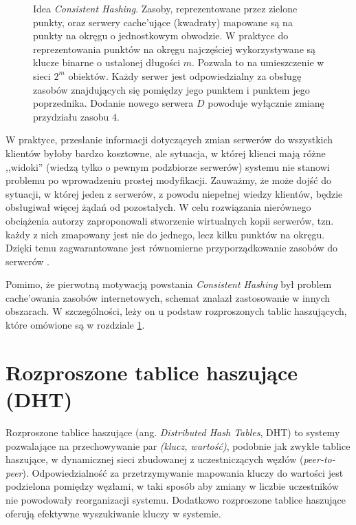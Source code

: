 \documentclass[a4paper,11pt]{scrartcl}
\newcommand{\s}{ }
\newcommand{\keszujace}{cache'ujące}
\newcommand{\keszowania}{cache'owania}
\begin{document}
\begin{figure}[ht]
\begin{minipage}[b]{0.47\linewidth}
\end{minipage}
\caption{Idea \textit{Consistent Hashing}. Zasoby, reprezentowane przez zielone punkty, oraz serwery \keszujace\s (kwadraty) mapowane są na punkty na okręgu o jednostkowym obwodzie. W praktyce do reprezentowania punktów na okręgu najczęściej wykorzystywane są klucze binarne o ustalonej długości $m$. Pozwala to na umieszczenie w sieci $2^m$ obiektów. Każdy serwer jest odpowiedzialny za obsługę zasobów znajdujących się pomiędzy jego punktem i punktem jego poprzednika. Dodanie nowego serwera $D$ powoduje wyłącznie zmianę przydziału zasobu $4$.}
\label{fig_consistent_hashing}
\end{figure}

W praktyce, przesłanie informacji dotyczących zmian serwerów do wszystkich klientów byłoby bardzo kosztowne, ale sytuacja, w której klienci mają różne ,,widoki'' (wiedzą tylko o pewnym podzbiorze serwerów) systemu nie stanowi problemu po wprowadzeniu prostej modyfikacji. Zauważmy, że może dojść do sytuacji, w której jeden z serwerów, z powodu niepełnej wiedzy klientów, będzie obsługiwał więcej żądań od pozostałych. W celu rozwiązania nierównego obciążenia autorzy zaproponowali stworzenie wirtualnych kopii serwerów, tzn. każdy z nich zmapowany jest nie do jednego, lecz kilku punktów na okręgu. Dzięki temu zagwarantowane jest równomierne przyporządkowanie zasobów do serwerów \cite{karger1999web}.

Pomimo, że pierwotną motywacją powstania \textit{Consistent Hashing} był problem \keszowania\s zasobów internetowych, schemat znalazł zastosowanie w innych obszarach. W szczególności, leży on u podstaw rozproszonych tablic haszujących, które omówione są w rozdziale \ref{sect_dht}.

\section{Rozproszone tablice haszujące (DHT)}
\label{sect_dht}
Rozproszone tablice haszujące (ang. \textit{Distributed Hash Tables}, DHT) to systemy pozwalające na przechowywanie par \textit{(klucz, wartość)}, podobnie jak zwykłe tablice haszujące, w dynamicznej sieci zbudowanej z uczestniczących węzłów (\textit{peer-to-peer}). Odpowiedzialność za przetrzymywanie mapowania kluczy do wartości jest podzielona pomiędzy węzłami, w taki sposób aby zmiany w liczbie uczestników nie powodowały reorganizacji systemu. Dodatkowo rozproszone tablice haszujące oferują efektywne wyszukiwanie kluczy w systemie.
\end{document}
